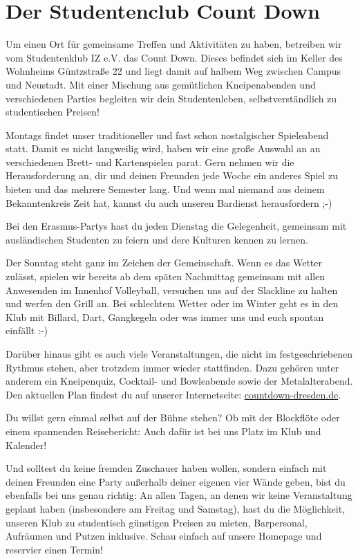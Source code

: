 \section{Der Studentenclub Count Down}


Um einen Ort für gemeinsame Treffen und Aktivitäten zu haben, betreiben wir vom Studentenklub IZ e.V. das Count Down.
Dieses befindet sich im Keller des Wohnheims Güntzstraße 22 und liegt damit auf halbem Weg zwischen Campus und Neustadt.
Mit einer Mischung aus gemütlichen Kneipenabenden und verschiedenen Parties begleiten wir dein Studentenleben, selbstverständlich zu studentischen Preisen!

Montags findet unser traditioneller und fast schon nostalgischer Spieleabend statt.
Damit es nicht langweilig wird, haben wir eine große Auswahl an an verschiedenen Brett- und Kartenspielen parat.
Gern nehmen wir die Herausforderung an, dir und deinen Freunden jede Woche ein anderes Spiel zu bieten und das mehrere Semester lang.
Und wenn mal niemand aus deinem Bekanntenkreis Zeit hat, kannst du auch unseren Bardienst herausfordern ;-)

Bei den Erasmus-Partys hast du jeden Dienstag die Gelegenheit, gemeinsam mit ausländischen Studenten zu feiern und dere Kulturen kennen zu lernen.

Der Sonntag steht ganz im Zeichen der Gemeinschaft.
Wenn es das Wetter zulässt, spielen wir bereits ab dem späten Nachmittag gemeinsam mit allen Anwesenden im Innenhof Volleyball, versuchen uns auf der Slackline zu halten und werfen den Grill an.
Bei schlechtem Wetter oder im Winter geht es in den Klub mit Billard, Dart, Gangkegeln oder was immer uns und euch spontan einfällt :-)

Darüber hinaus gibt es auch viele Veranstaltungen, die nicht im festgeschriebenen Rythmus stehen, aber trotzdem immer wieder stattfinden.
Dazu gehören unter anderem ein Kneipenquiz, Cocktail- und Bowleabende sowie der Metalalterabend.
Den aktuellen Plan findest du auf unserer Internetseite: \url{countdown-dresden.de}.

Du willst gern einmal selbst auf der Bühne stehen?
Ob mit der Blockflöte oder einem spannenden Reisebericht:
Auch dafür ist bei uns Platz im Klub und Kalender!

Und solltest du keine fremden Zuschauer haben wollen, sondern einfach mit deinen Freunden eine Party außerhalb deiner eigenen vier Wände geben, bist du ebenfalls bei uns genau richtig:
An allen Tagen, an denen wir keine Veranstaltung geplant haben (insbesondere am Freitag und Samstag), hast du die Möglichkeit, unseren Klub zu studentisch günstigen Preisen zu mieten, Barpersonal, Aufräumen und Putzen inklusive.
Schau einfach auf unsere Homepage und reservier einen Termin!

